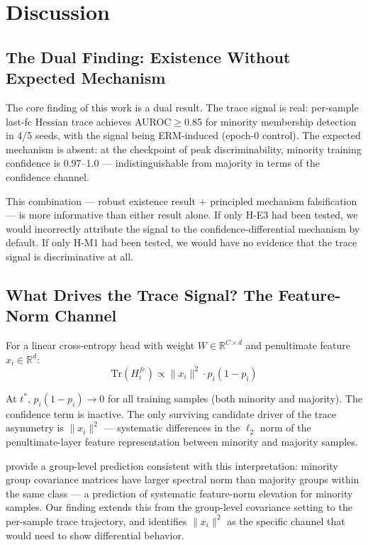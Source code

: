 \section{Discussion}
\label{sec:discussion}

\subsection{The Dual Finding: Existence Without Expected Mechanism}

The core finding of this work is a dual result. The trace signal is real: per-sample last-fc Hessian trace achieves AUROC$\geq$0.85 for minority membership detection in 4/5 seeds, with the signal being ERM-induced (epoch-0 control). The expected mechanism is absent: at the checkpoint of peak discriminability, minority training confidence is 0.97--1.0 --- indistinguishable from majority in terms of the confidence channel.

This combination --- robust existence result + principled mechanism falsification --- is more informative than either result alone. If only H-E3 had been tested, we would incorrectly attribute the signal to the confidence-differential mechanism by default. If only H-M1 had been tested, we would have no evidence that the trace signal is discriminative at all.

\subsection{What Drives the Trace Signal? The Feature-Norm Channel}

For a linear cross-entropy head with weight $W \in \mathbb{R}^{C\times d}$ and penultimate feature $x_i \in \mathbb{R}^d$:
\begin{equation}
\text{Tr}(H_i^{fc}) \propto \|x_i\|^2 \cdot p_i(1 - p_i)
\end{equation}

At $t^*$, $p_i(1-p_i)\to 0$ for all training samples (both minority and majority). The confidence term is inactive. The only surviving candidate driver of the trace asymmetry is $\|x_i\|^2$ --- systematic differences in the $\ell_2$ norm of the penultimate-layer feature representation between minority and majority samples.

\cite{labonte2024spectral} provide a group-level prediction consistent with this interpretation: minority group covariance matrices have larger spectral norm than majority groups within the same class --- a prediction of systematic feature-norm elevation for minority samples. Our finding extends this from the group-level covariance setting to the per-sample trace trajectory, and identifies $\|x_i\|^2$ as the specific channel that would need to show differential behavior.

